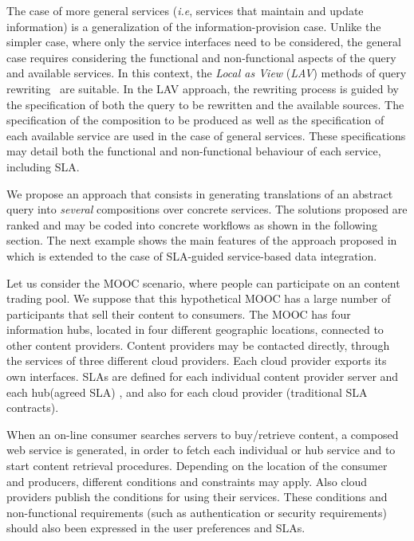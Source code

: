 The case of more general services (\textit{i.e}, services that maintain and update information) is a generalization of the information-provision case.
Unlike the simpler case, where only the service interfaces need to be considered, the general case requires considering the functional and non-functional aspects of the query and available services.
In this context, the \textit{Local as View} (\textit{LAV}) methods of query rewriting~\cite{Levy2000} are suitable.
In the LAV approach, the rewriting process is guided by the specification of both the query to be rewritten and the available sources.
The specification of the composition to be produced as well as the specification of each available service are used in the case of general services.
These specifications may detail both the functional and non-functional behaviour of each service, including SLA.


We propose an approach that consists in generating translations of an abstract query into \textit{several}  compositions over concrete  services. 
The solutions proposed are ranked and may be coded into concrete workflows as shown in the following section.  The next example shows the main features of the approach proposed in~\cite{CostaAMR13} which is extended to the case of SLA-guided service-based data integration. 

Let us consider the MOOC scenario, where people can participate on an content trading pool.
We suppose that this hypothetical MOOC has a large number of participants that sell their content  to  consumers. 
The MOOC has four information hubs, located in four different geographic locations, connected to other content providers.
Content providers may be  contacted directly, through the services of three different cloud providers.
Each cloud provider exports its own interfaces.
SLAs are defined for each individual content provider server and  each hub(agreed SLA)  , and also for each cloud provider (traditional SLA contracts). 

When an on-line consumer searches servers to buy/retrieve content, a composed web service is generated, in order to fetch each individual or hub service and to start  content retrieval procedures.
Depending on the location of the consumer and producers, different conditions and constraints may apply.
Also  cloud providers  publish the conditions for using their services.
These conditions and non-functional requirements (such as authentication or security requirements) should also been expressed in the user preferences and SLAs.

